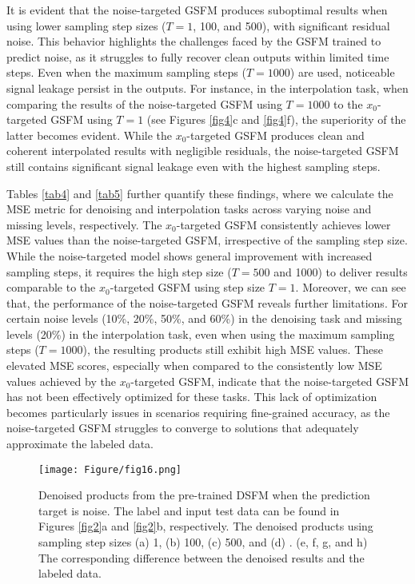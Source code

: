 It is evident that the noise-targeted GSFM produces suboptimal results when using lower sampling step sizes ($T=1$, 100, and 500), with significant residual noise. This behavior highlights the challenges faced by the GSFM trained to predict noise, as it struggles to fully recover clean outputs within limited time steps. Even when the maximum sampling steps ($T=1000$) are used, noticeable signal leakage persist in the outputs. For instance, in the interpolation task, when comparing the results of the noise-targeted GSFM using $T=1000$ to the $x_0$-targeted GSFM using $T=1$ (see Figures \ref{fig4}c and \ref{fig4}f), the superiority of the latter becomes evident. While the $x_0$-targeted GSFM produces clean and coherent interpolated results with negligible residuals, the noise-targeted GSFM still contains significant signal leakage even with the highest sampling steps.  

Tables \ref{tab4} and \ref{tab5} further quantify these findings, where we calculate the MSE metric for denoising and interpolation tasks across varying noise and missing levels, respectively. The $x_0$-targeted GSFM consistently achieves lower MSE values than the noise-targeted GSFM, irrespective of the sampling step size. While the noise-targeted model shows general improvement with increased sampling steps, it requires the high step size ($T=500$ and 1000) to deliver results comparable to the $x_0$-targeted GSFM using step size $T=1$. Moreover, we can see that, the performance of the noise-targeted GSFM reveals further limitations. For certain noise levels (10\%, 20\%, 50\%, and 60\%) in the denoising task and missing levels (20\%) in the interpolation task, even when using the maximum sampling steps ($T=1000$), the resulting products still exhibit high MSE values. These elevated MSE scores, especially when compared to the consistently low MSE values achieved by the $x_0$-targeted GSFM, indicate that the noise-targeted GSFM has not been effectively optimized for these tasks. This lack of optimization becomes particularly issues in scenarios requiring fine-grained accuracy, as the noise-targeted GSFM struggles to converge to solutions that adequately approximate the labeled data. 


\begin{figure*}[htbp]
\centering
\texttt{[image: Figure/fig16.png]}
\caption{Denoised products from the pre-trained DSFM when the prediction target is noise. The label and input test data can be found in Figures \ref{fig2}a and \ref{fig2}b, respectively. The denoised products using sampling step sizes (a) 1, (b) 100, (c) 500, and (d)
. (e, f, g, and h) The corresponding difference between the denoised results and the labeled data. }
\label{fig16}
\end{figure*}


